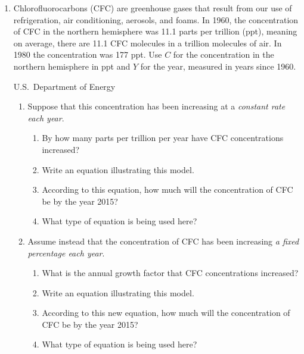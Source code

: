 \begin{enumerate}
\item Chlorofluorocarbons (CFC) are greenhouse gases that result from our use of refrigeration, air conditioning, aerosols, and foams.  In 1960, the concentration of CFC in the northern hemisphere was 11.1 parts per trillion (ppt), meaning on average, there are 11.1 CFC molecules in a trillion molecules of air.  In 1980 the concentration was 177 ppt.  Use $C$ for the concentration in the northern hemisphere in ppt and $Y$ for the year, measured in years since 1960.  
\hfill \begin{footnotesize} U.S.\ Department of Energy \end{footnotesize}
\begin{enumerate}
\item Suppose that this concentration has been increasing at a \emph{constant rate each year}.
\begin{enumerate}
\item By how many parts per trillion per year have CFC concentrations increased?
\item Write an equation illustrating this model.
\item According to this equation, how much will the concentration of CFC be by the year 2015?
\item What type of equation is being used here?
\end{enumerate}
\item  Assume instead that the concentration of CFC has been increasing \emph{a fixed percentage each year}.
\begin{enumerate}
\item What is the annual growth factor that CFC concentrations increased?  
\item Write an equation illustrating this model.
\item According to this new equation, how much will the concentration of CFC be by the year 2015?
\item What type of equation is being used here?
\end{enumerate}
\end{enumerate}


\end{enumerate}
